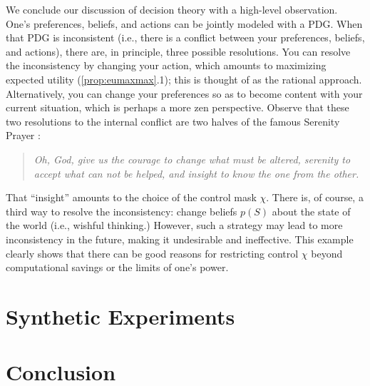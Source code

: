 \documentclass[twoside]{article}
\theoremstyle{plain}
\theoremstyle{definition}
\theoremstyle{remark}
\begin{document}
We conclude our discussion of decision theory with a high-level observation. 
One's preferences, beliefs, and actions can be jointly modeled with a PDG. 
When that PDG is inconsistent (i.e., there is a conflict between your preferences, beliefs, and actions),
there are, in principle, three possible resolutions.
You can 
resolve the inconsistency by changing your action, 
   which amounts to maximizing expected utility (\cref{prop:eumaxmax}.1);
   this is thought of as the {rational} approach.
Alternatively, 
   you can change your preferences so as to become content with your current situation, 
   which is perhaps a more zen perspective. 
Observe that these two resolutions to the internal conflict are two halves of the famous Serenity Prayer \citep{serenity-prayer}:
\begin{quotation}\it
   \noindent
   Oh, God,
   give us the courage to change what must be altered, serenity to accept what can not be helped, and insight to know the one from the other.
\end{quotation}
That ``insight'' amounts to the choice of the control mask $\chi$. 
%
There is, of course, a third way to resolve the inconsistency: change beliefs $p(S)$ about the state of the world (i.e., wishful thinking.) 
However, such a strategy may lead to more inconsistency in the future, making it undesirable and ineffective.  
This example clearly shows that
   there can be good reasons for 
   restricting control $\chi$ 
   beyond computational savings or the limits of one's power.




\section{Synthetic Experiments}
\section{Conclusion}
\end{document}
